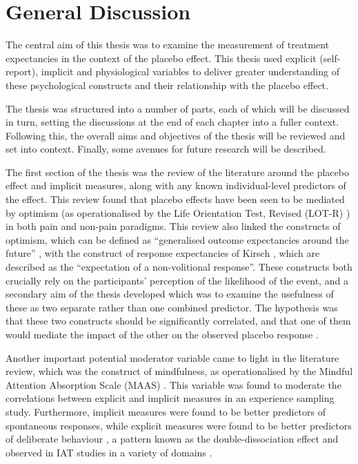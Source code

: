 

\section{General Discussion}

The central aim of this thesis was to examine the measurement of
treatment expectancies in the context of the placebo effect. This
thesis used explicit (self-report), implicit and physiological
variables to deliver greater understanding of these psychological
constructs and their relationship with the placebo effect.


The thesis was structured into a number of parts, each of which will
be discussed in turn, setting the discussions at the end of each
chapter into a fuller context. Following this, the overall aims and
objectives of the thesis will be reviewed and set into context.
Finally, some avenues for future research will be described.

The first section of the thesis was the review of the literature
around the placebo effect and implicit measures, along with any known
individual-level predictors of the effect. This review found that
placebo effects have been seen to be mediated by optimism (as
operationalised by the Life Orientation Test, Revised (LOT-R)
\cite{Scheier1994}) \cite{Geers2005,morton2009reproducibility} in both
pain and non-pain paradigms. This review also linked the constructs of
optimism, which can be defined as ``generalised outcome expectancies
around the future'' \cite{Carver2010}, with the construct of response
expectancies of Kirsch \cite{Kirsch1985,Kirsch1997}, which are
described as the ``expectation of a non-volitional response''. These
constructs both crucially rely on the participants' perception of the
likelihood of the event, and a secondary aim of the thesis developed
which was to examine the usefulness of these as two separate rather
than one combined predictor. The hypothesis was that these two
constructs should be significantly correlated, and that one of them
would mediate the impact of the other on the observed placebo response
\cite{Geers2005}.

Another important potential moderator variable came to light in the
literature review, which was the construct of mindfulness, as
operationalised by the Mindful Attention Absorption Scale (MAAS)
\cite{brown2003benefits}. This variable was found to moderate the
correlations between explicit and implicit measures in an experience
sampling study. Furthermore, implicit measures were found to be better
predictors of spontaneous responses, while explicit measures were
found to be better predictors of deliberate behaviour
\cite{Levesque2007}, a pattern known as the double-dissociation effect
and observed in IAT studies in a variety of domains
\cite{Asendorpf2002,Perugini2005,Grumm2007,Steffens2006}.

